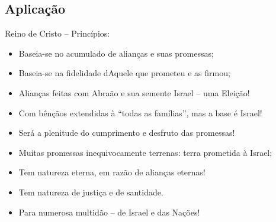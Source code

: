 \documentclass[12pt,aspectratio=169]{beamer}
\newcommand{\ORA}[1]{{\textcolor{TXred!50!TXyel}{#1}}}
\newcommand{\YEL}[1]{{\textcolor{TXyel}{#1}}}
\newcommand{\GRE}[1]{{\textcolor{TXgre}{#1}}}
\newcommand{\CYA}[1]{{\textcolor{TXcya}{#1}}}
\newcommand{\BLU}[1]{{\textcolor{TXblu}{#1}}}
\newcommand{\MAG}[1]{{\textcolor{TXmag}{#1}}}
\begin{document}
    \subsection{Aplicação}

    \begin{frame}{\YEL{Reino de Cristo} -- Princípios:}
        \begin{itemize}
            \item<1-> Baseia-se no \YEL{acumulado} de \GRE{alianças} e suas \ORA{promessas};
            \item<1-> Baseia-se na \CYA{fidelidade} dAquele que prometeu e as firmou;
            \item<1-> Alianças feitas com Abraão e sua semente \BLU{Israel} -- uma \YEL{Eleição}!
            \item<1-> Com bênçãos extendidas à ``\YEL{todas as famílias}'', mas a base é
                \BLU{Israel}!
            \item<1-> Será a \YEL{plenitude do cumprimento} e desfruto das promessas!
            \item<1-> Muitas promessas inequivocamente \ORA{terrenas}: \ORA{terra} prometida à
                \BLU{Israel};
            \item<1-> Tem natureza \MAG{eterna}, em razão de alianças \MAG{eternas}!
            \item<1-> Tem natureza de \YEL{justiça} e de \YEL{santidade}.
            \item<1-> Para \GRE{numerosa multidão} -- de \BLU{Israel} e das Nações!
        \end{itemize}
    \end{frame}

\end{document}
